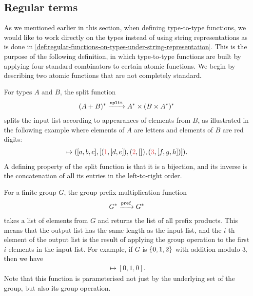 \subsection{Regular terms}
\label{sec:regular-terms}
As we mentioned earlier in this section, when defining type-to-type functions, we would like to work directly on the types instead of using string representations as is done in \cref{def:regular-functions-on-types-under-string-representation}. This is the purpose of the following definition, in which type-to-type functions are built by applying four standard combinators to certain atomic functions. We begin by describing two atomic functions that are not completely standard. 

\begin{myexample}[Split]\label{ex:split}
    For types $A$ and $B$, the split function 
    \begin{align*}
    (A + B)^* \xrightarrow{\mathtt{split}} A^* \times (B \times A^*)^*
    \end{align*}
    splits the input list according to appearances of elements from $B$, as illustrated in the following example where elements of $A$ are letters and elements of $B$ are red digits:
    \begin{align*}
    [a,b,c,\red 1,d,e,\red 2,\red 3,f,g,h] \mapsto ([a,b,c],[(\red 1,[d,e]),(\red 2,[]), (\red 3,[f,g,h])]).
    \end{align*}
    A defining property of the split function is that it is a bijection, and its inverse is the concatenation of all its entries in the left-to-right order. 
\end{myexample}

\begin{myexample}
    For a finite group $G$, the group prefix multiplication function 
    \begin{align*}
    G^* \xrightarrow{\mathtt{pref}} G^*
    \end{align*}
    takes a list of elements from $G$ and returns the list of all prefix products. This means that the output list has the same length as the input list, and the $i$-th element of the output list is the result of applying the group operation  to the first $i$ elements in the input list. For example, if $G$ is $\{0,1,2\}$ with addition modulo 3, then we have
    \begin{align*}
    [0,1,2] \mapsto [0,1,0].
    \end{align*}
    Note that this function is parameterised not just by the underlying set of the group, but also its group operation. 
\end{myexample}

